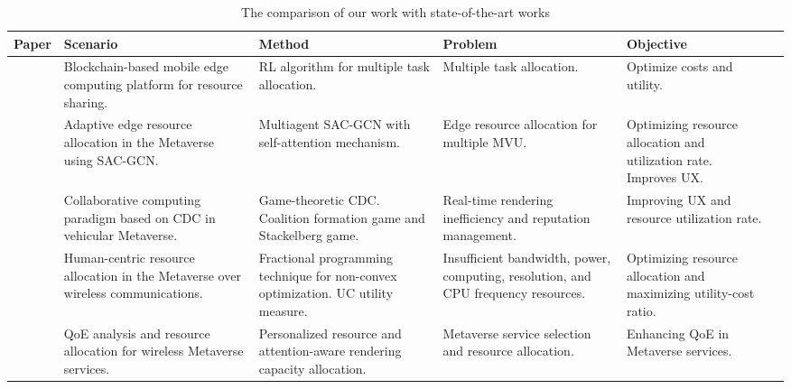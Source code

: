 \begin{table*}[http]
	\scriptsize
    \caption{The comparison of our work with state-of-the-art works}
	\label{tab.1}
	\centering
	 \begin{tabular}{|p{0.8cm}| p{3.9cm}| p{3.6cm}| p{3.5cm}| p{3.8cm}| p{4.5cm}| }
    \hline
  \textbf{Paper} & \textbf{Scenario}&\textbf{Method}&\textbf{Problem}&\textbf{Objective}\\
		\hline
   \cite{9973630} & Blockchain-based mobile edge computing platform for resource sharing.&RL algorithm for multiple task allocation. & Multiple task allocation.
 & Optimize costs and utility. \\
   \hline
   \cite{10144631} & Adaptive edge resource allocation in the Metaverse using SAC-GCN.&Multiagent SAC-GCN with self-attention mechanism. & Edge resource allocation for multiple MVU. & Optimizing resource allocation and utilization rate. Improves UX. 
\\
		\hline
  \cite{9880566} &Collaborative computing paradigm based on CDC in vehicular Metaverse. & Game-theoretic CDC. Coalition formation game and Stackelberg game.  &Real-time rendering inefficiency
and reputation management.
 &Improving UX and resource utilization rate. \\
  \hline
\cite{10368052} & Human-centric resource allocation in the Metaverse over wireless communications. & Fractional programming technique for non-convex optimization. UC utility measure. &Insufficient bandwidth, power, computing, resolution, and CPU frequency resources.
 &Optimizing resource allocation and maximizing utility-cost ratio.\\
\hline
 \cite{10148094} & QoE analysis and resource allocation for wireless Metaverse services. &Personalized resource and attention-aware rendering capacity allocation. & Metaverse
service selection and resource allocation. & Enhancing QoE in Metaverse services.
\\
		\hline


\end{tabular}
\end{table*}
